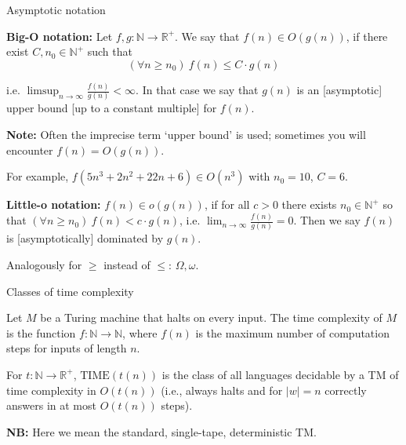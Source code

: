 \documentclass[handout]{beamer}
\begin{document}
\begin{frame}{Asymptotic notation}
    
    \textbf{Big-O notation:} Let $f,g: \mathbb{N}\to \mathbb{R}^+$. We say that \alert{$f(n)\in O(g(n))$}, if there exist $C,n_0\in \mathbb{N}^+$ such that
    $$
    (\forall n\geq n_0)\ f(n)\leq C\cdot g(n)
    $$

    i.e. $\limsup_{n\to\infty}\frac{f(n)}{g(n)}<\infty$. In that case we say that $g(n)$ is an [asymptotic] \alert{upper bound} [up to a constant multiple] for $f(n)$. 
    
    \textbf{Note:} Often the imprecise term `upper bound' is used; sometimes you will encounter $f(n)=O(g(n))$.

    For example, $f(5n^3+2n^2+22n+6)\in O(n^3)$ with $n_0=10$, $C=6$.

    \medskip

    \textbf{Little-o notation:} \alert{$f(n)\in o(g(n))$}, if for all $c>0$ there exists $n_0\in \mathbb{N}^+$ so that
    $(\forall n\geq n_0)\ f(n)<c\cdot g(n)$, i.e. $\lim_{n\to\infty}\frac{f(n)}{g(n)}=0$. Then we say $f(n)$ is [asymptotically] \alert{dominated} by $g(n)$.
    
    Analogously for $\geq$ instead of $\leq$:  $\Omega,\omega$.

\end{frame}


\begin{frame}{Classes of time complexity}

    \begin{definition}
        Let $M$ be a Turing machine that halts on every input. The \alert{time complexity} of $M$ is the function $f:\mathbb{N}\to \mathbb{N}$, where $f(n)$ is the maximum number of computation steps for inputs of length $n$.
    \end{definition}
    
    \begin{definition}
        For $t:\mathbb{N}\to \mathbb{R}^+$, \alert{$\mathrm{TIME}(t(n))$} is the class of all languages decidable by a TM of time complexity in $O(t(n))$ (i.e., always halts and for $|w|=n$ correctly answers in at most $O(t(n))$ steps).
    \end{definition}

    \textbf{NB:} Here we mean the standard, single-tape, deterministic TM.
    
\end{frame}
\end{document}
